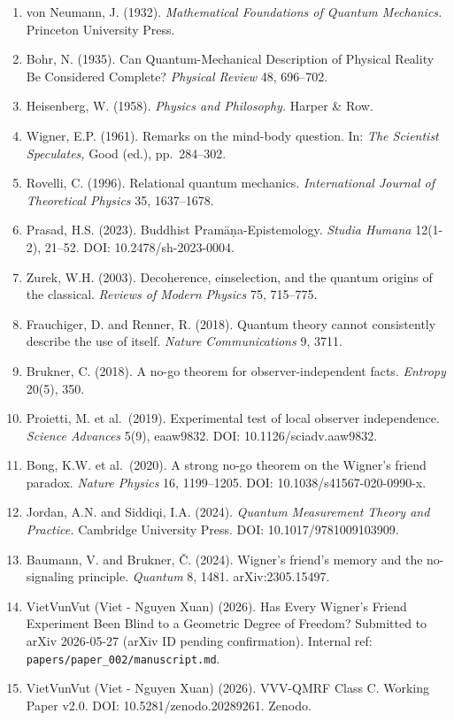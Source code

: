 \documentclass[
  11pt,
]{article}
\providecommand{\tightlist}{%
  \setlength{\itemsep}{0pt}\setlength{\parskip}{0pt}}
\begin{document}
\begin{enumerate}
\def\labelenumi{\arabic{enumi}.}
\tightlist
\item
  von Neumann, J. (1932). \emph{Mathematical Foundations of Quantum
  Mechanics.} Princeton University Press.
\item
  Bohr, N. (1935). Can Quantum-Mechanical Description of Physical
  Reality Be Considered Complete? \emph{Physical Review} 48, 696--702.
\item
  Heisenberg, W. (1958). \emph{Physics and Philosophy.} Harper \& Row.
\item
  Wigner, E.P. (1961). Remarks on the mind-body question. In: \emph{The
  Scientist Speculates,} Good (ed.), pp.~284--302.
\item
  Rovelli, C. (1996). Relational quantum mechanics. \emph{International
  Journal of Theoretical Physics} 35, 1637--1678.
\item
  Prasad, H.S. (2023). Buddhist Pramāṇa-Epistemology. \emph{Studia
  Humana} 12(1-2), 21--52. DOI: 10.2478/sh-2023-0004.
\item
  Zurek, W.H. (2003). Decoherence, einselection, and the quantum origins
  of the classical. \emph{Reviews of Modern Physics} 75, 715--775.
\item
  Frauchiger, D. and Renner, R. (2018). Quantum theory cannot
  consistently describe the use of itself. \emph{Nature Communications}
  9, 3711.
\item
  Brukner, C. (2018). A no-go theorem for observer-independent facts.
  \emph{Entropy} 20(5), 350.
\item
  Proietti, M. et al.~(2019). Experimental test of local observer
  independence. \emph{Science Advances} 5(9), eaaw9832. DOI:
  10.1126/sciadv.aaw9832.
\item
  Bong, K.W. et al.~(2020). A strong no-go theorem on the Wigner's
  friend paradox. \emph{Nature Physics} 16, 1199--1205. DOI:
  10.1038/s41567-020-0990-x.
\item
  Jordan, A.N. and Siddiqi, I.A. (2024). \emph{Quantum Measurement
  Theory and Practice.} Cambridge University Press. DOI:
  10.1017/9781009103909.
\item
  Baumann, V. and Brukner, Č. (2024). Wigner's friend's memory and the
  no-signaling principle. \emph{Quantum} 8, 1481. arXiv:2305.15497.
\item
  VietVunVut (Viet - Nguyen Xuan) (2026). Has Every Wigner's Friend
  Experiment Been Blind to a Geometric Degree of Freedom? Submitted to
  arXiv 2026-05-27 (arXiv ID pending confirmation). Internal ref:
  \texttt{papers/paper\_002/manuscript.md}.
\item
  VietVunVut (Viet - Nguyen Xuan) (2026). VVV-QMRF Class C. Working
  Paper v2.0. DOI: 10.5281/zenodo.20289261. Zenodo.
\end{enumerate}
\end{document}
